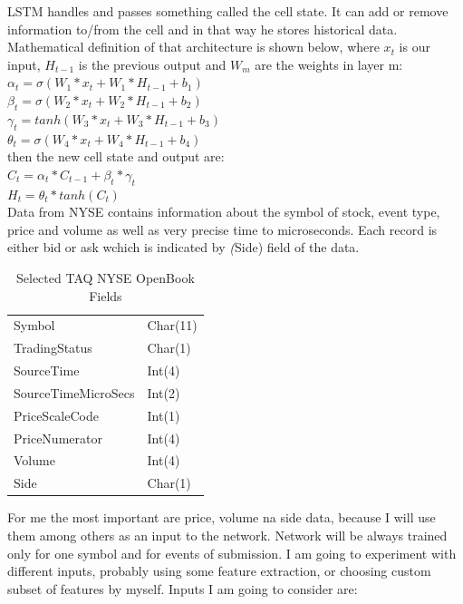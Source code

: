 \documentclass[twoside]{article}
\begin{document}
\begin{multicols}{2}
LSTM handles and passes something called the cell state. It can add or remove information to/from the cell and in that way he stores
historical data. Mathematical definition of that architecture is shown below, where $x_{t}$ is our input, $H_{t-1}$ is the previous output and 
$W_{m}$ are the weights in layer m: \\
\newline
$ \alpha_{t} = \sigma(W_{1} * x_{t} + W_{1} * H_{t-1} + b_{1}) $ \\
$ \beta_{t} = \sigma(W_{2} * x_{t} + W_{2} * H_{t-1} + b_{2}) $ \\
$ \gamma_{t} = tanh(W_{3} * x_{t} + W_{3} * H_{t-1} + b_{3}) $ \\
$ \theta_{t} = \sigma(W_{4} * x_{t} + W_{4} * H_{t-1} + b_{4}) $ \\
\newline
then the new cell state and output are:  \\
\newline
$ C_{t} = \alpha_{t} * C_{t-1} + \beta_{t} * \gamma_{t} $ \\
$ H_{t} = \theta_{t} * tanh(C_{t}) $ \\


Data from NYSE contains information about the symbol of stock, event type, price and volume as well as very precise time to microseconds.
Each record is either bid or ask wchich is indicated by \emph(Side) field of the data.  

\begin{table}[H]
\caption{Selected TAQ NYSE OpenBook Fields}
\centering
\begin{tabular}{ll}
Symbol & Char(11) \\
TradingStatus & Char(1) \\
SourceTime & Int(4) \\
SourceTimeMicroSecs & Int(2) \\
PriceScaleCode & Int(1) \\
PriceNumerator & Int(4) \\
Volume & Int(4) \\ 
Side & Char(1) \\
\end{tabular}
\end{table}

For me the most important are price, volume na side data, because I will use them among others as an input to the network. 
Network will be always trained only for one symbol and for events of submission. I am going to experiment with different inputs,
probably using some feature extraction, or choosing custom subset of features by myself.
Inputs I am going to consider are:


\end{multicols}
\end{document}

